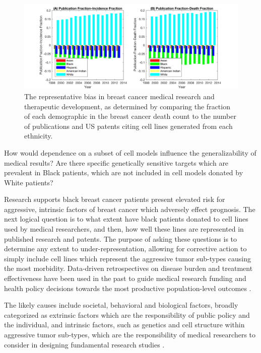 \documentclass[11pt]{article}
\begin{document}
\begin{figure}[h!]
\centering
\includegraphics[width=1\columnwidth, trim = {10cm 0cm 10cm 0cm}, clip]{Figures/Bias.jpg}
\caption{\label{Bias} The representative bias in breast cancer medical research and therapeutic development, as determined by comparing the fraction of each demographic in the breast cancer death count to the number of publications and US patents citing cell lines generated from each ethnicity.}
\end{figure}

How would dependence on a subset of cell models influence the generalizability of medical results? Are there specific genetically sensitive targets which are prevalent in Black patients, which are not included in cell models donated by White patients? 

Research supports black breast cancer patients present elevated risk for aggressive, intrinsic factors of breast cancer which adversely effect prognosis. The next logical question is to what extent have black patients donated to cell lines used by medical researchers, and then, how well these lines are represented in published research and patents. The purpose of asking these questions is to determine any extent to under-representation, allowing for corrective action to simply include cell lines which represent the aggressive tumor sub-types causing the most morbidity. Data-driven retrospectives on disease burden and treatment effectiveness have been used in the past to guide medical research funding and health policy decisions towards the most productive population-level outcomes \cite{kim2016cancer}. 

The likely causes include societal, behavioral and biological factors, broadly categorized as extrinsic factors which are the responsibility of public policy and the individual, and intrinsic factors, such as genetics and cell structure within aggressive tumor sub-types, which are the responsibility of medical researchers to consider in designing fundamental research studies \cite{reding2012examination, brennan2012there}. 
\end{document}
